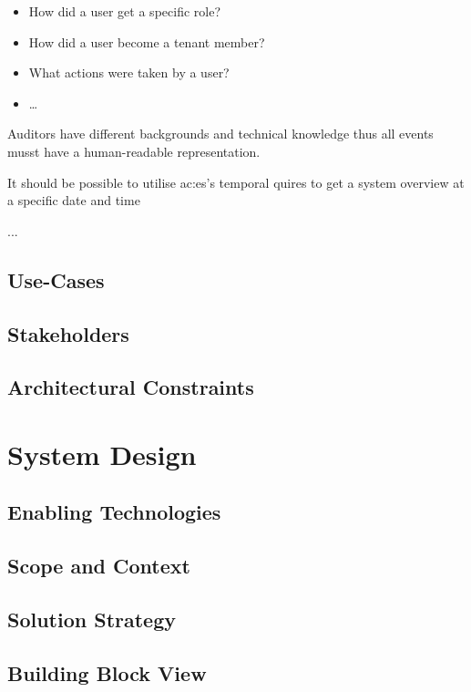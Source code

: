 \begin{itemize}
  \item How did a user get a specific role?
  \item How did a user become a tenant member?
  \item What actions were taken by a user?
  \item \dots
\end{itemize}

Auditors have different backgrounds and technical knowledge thus all events musst have a human-readable representation.

It should be possible to utilise \gls{ac:es}'s temporal quires  to get a system overview at a specific date and time 

...~\citep{SAIP}

\subsection{Use-Cases}

\subsection{Stakeholders}

\subsection{Architectural Constraints}


\section{System Design}

\subsection{Enabling Technologies}

\subsection{Scope and Context}

\subsection{Solution Strategy}

\subsection{Building Block View}


